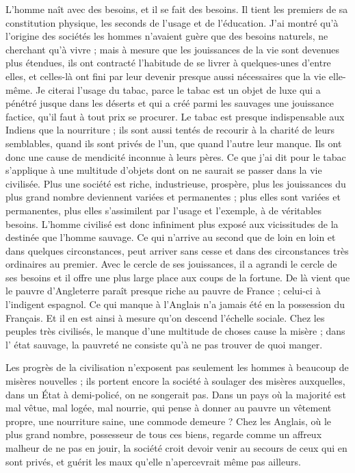 \documentclass[french,twoside]{book} %
\begin{document}
L'homme naît avec des besoins, et il se fait des besoins. Il tient les premiers de sa constitution physique, les seconds de l’usage et de l’éducation. J'ai montré qu’à l’origine des sociétés les hommes n’avaient guère que des besoins naturels, ne cherchant qu’à vivre ; mais à mesure que les jouissances de la vie sont devenues plus étendues, ils ont contracté l’habitude de se livrer à quelques-unes d’entre elles, et celles-là ont fini par leur devenir presque aussi nécessaires que la vie elle-même. Je citerai l’usage du tabac, parce le tabac est un objet de luxe qui a pénétré jusque dans les déserts et qui a créé parmi les sauvages une jouissance factice, qu’il faut à tout prix se procurer. Le tabac est presque indispensable aux Indiens que la nourriture ; ils sont aussi tentés de recourir à la charité de leurs semblables, quand ils sont privés de l’un, que quand l’autre leur manque. Ils ont donc une cause de mendicité inconnue à leurs pères. Ce que j’ai dit pour le tabac s’applique à une multitude d’objets dont on ne saurait se passer dans la vie civilisée. Plus une société est riche, industrieuse, prospère, plus les jouissances du plus grand nombre deviennent variées et permanentes ; plus elles sont variées et permanentes, plus elles s’assimilent par l’usage et l’exemple, à de véritables besoins. L'homme civilisé est donc infiniment plus exposé aux vicissitudes de la destinée que l’homme sauvage. Ce qui n’arrive au second que de loin en loin et dans quelques circonstances, peut arriver sans cesse et dans des circonstances très ordinaires au premier. Avec le cercle de ses jouissances, il a agrandi le cercle de ses besoins et il offre une plus large place aux coups de la fortune. De là vient que le pauvre d’Angleterre paraît presque riche au pauvre de France ; celui-ci à l’indigent espagnol. Ce qui manque à l’Anglais n’a jamais été en la possession du Français. Et il en est ainsi à mesure qu’on descend l’échelle sociale. Chez les peuples très civilisés, le manque d’une multitude de choses cause la misère ; dans l’ état sauvage, la pauvreté ne consiste qu’à ne pas trouver de quoi manger.\par
Les progrès de la civilisation n’exposent pas seulement les hommes à beaucoup de misères nouvelles ; ils portent encore la société à soulager des misères auxquelles, dans un État à demi-policé, on ne songerait pas. Dans un pays où la majorité est mal vêtue, mal logée, mal nourrie, qui pense à donner au pauvre un vêtement propre, une nourriture saine, une commode demeure ? Chez les Anglais, où le plus grand nombre, possesseur de tous ces biens, regarde comme un affreux malheur de ne pas en jouir, la société croit devoir venir au secours de ceux qui en sont privés, et guérit les maux qu’elle n’apercevrait même pas ailleurs.\par
\end{document}
